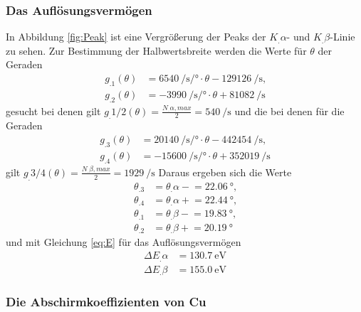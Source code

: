 \subsubsection{Das Auflösungsvermögen}

In Abbildung \ref{fig:Peak} ist eine Vergrößerung der Peaks der $K_.{\alpha}$- und $K_.{\beta}$-Linie zu sehen.
Zur Bestimmung der Halbwertsbreite werden die Werte für $\theta$ der Geraden
\begin{align*}
g_.1(\theta)&=\SI{6540}{\per\second\per\degree}\cdot\theta-\SI{129126}{\per\second}\text{,}\\
g_.2(\theta)&=\SI{-3990}{\per\second\per\degree}\cdot\theta+\SI{81082}{\per\second}
\end{align*}
gesucht bei denen gilt $g_.{1/2}(\theta)=\frac{N_.{\alpha,max}}{2}=\SI{540}{\per\second}$
und die bei denen für die Geraden
\begin{align*}
g_.3(\theta)&=\SI{20140}{\per\second\per\degree}\cdot\theta-\SI{442454}{\per\second}\text{,}\\
g_.4(\theta)&=\SI{-15600}{\per\second\per\degree}\cdot\theta+\SI{352019}{\per\second}
\end{align*}
gilt $g_.{3/4}(\theta)=\frac{N_.{\beta,max}}{2}=\SI{1929}{\per\second}$
Daraus ergeben sich die Werte
\begin{align*}
\theta_.3&=\theta_.{\alpha-}=\SI{22,06}{\degree}\text{,}\\
\theta_.4&=\theta_.{\alpha+}=\SI{22,44}{\degree}\text{,}\\
\theta_.1&=\theta_.{\beta-}=\SI{19,83}{\degree}\text{,}\\
\theta_.2&=\theta_.{\beta+}=\SI{20,19}{\degree}
\end{align*}
und mit Gleichung \ref{eq:E} für das Auflösungsvermögen
\begin{align*}
\Delta E_.{\alpha}&=\SI{130,7}{\eV}\\
\Delta E_.{\beta}&=\SI{155,0}{\eV}
\end{align*}

\subsubsection{Die Abschirmkoeffizienten von Cu}

